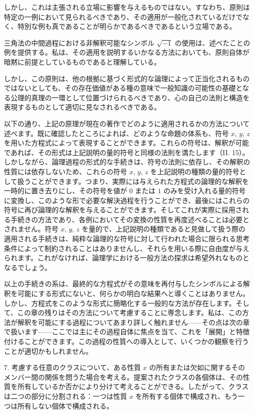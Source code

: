 \documentclass[a4paper,11pt,openany]{ltjsbook}
\begin{document}
しかし、これは主張される立場に影響を与えるものではない。すなわち、原則は特定の一例において見られるべきであり、その適用が一般化されているだけでなく、特別な例も真であることが明らかであるべきであるという立場である。

三角法の中間過程における非解釈可能なシンボル $\sqrt{-1}$ の使用は、述べたことの例を提供する。私は、その適用を説明するいかなる方法においても、原則自体が暗黙に前提としているものであると理解している。

しかし、この原則は、他の根拠に基づく形式的な論理によって正当化されるものではないとしても、その存在価値がある種の意味で一般知識の可能性の基礎となる公理的真理の一環として位置づけられるべきであり、心の自己の法則と構造を表現するものとして適切に見なされるべきである。

以下の通り、上記の原理が現在の著作でどのように適用されるかの方法について述べます。既に確認したところによれば、どのような命題の体系も、符号 $x$, $y$, $z$ を用いた方程式によって表現することができます。これらの符号は、解釈が可能であれば、その形式は上記説明の量的符号と同様の法則を満たします（II. 15）。しかしながら、論理過程の形式的な手続きは、符号の法則に依存し、その解釈の性質には依存しないため、これらの符号 $x$, $y$, $z$ を上記説明の種類の量的符号として扱うことができます。つまり、実際には与えられた方程式の論理的な解釈を一時的に置き去りにし、その符号を値が $0$ または $1$ のみを受け入れる量的符号に変換し、このような形で必要な解決過程を行うことができ、最後にはこれらの符号に再び論理的な解釈を与えることができます。そしてこれが実際に採用される手続きの方法であり、各例においてその変換の性質を再度述べることは必要とされません。符号 $x$, $y$, $z$ を量的で、上記説明の種類であると見做して扱う際の適用される手続きは、純粋な論理的な符号に対して行われた場合に限られる思考条件によって制約されることはありませんし、それらを用いる際に自由度が与えられます。これがなければ、論理学における一般方法の探求は希望外れなものとなるでしょう。

以上の手続きの系は、最終的な方程式がその意味を再付与したシンボルによる解釈を可能にする形式にないと、何らかの明白な結果へと導くことはありません。しかし、方程式をこのような形式に簡略化する一般的な方法が存在します。そして、この章の残りはその方法について考慮することに専念します。私は、この方法が解釈を可能にする過程についてあまり詳しく触れません——その点は次の章で扱います——ここでは主にその過程自体に焦点を当て、これを「展開」と特徴付けることができます。この過程の性質への導入として、いくつかの観察を行うことが適切かもしれません。

7. 考慮する任意のクラスについて、ある性質 \( x \) の所有または欠如に関するそのメンバー間の関係を問うた場合を考える。提案されたクラスの各個体は、その性質を所有しているか否かにより分けて考えることができる。したがって、クラスは二つの部分に分割される：一つは性質 \( x \) を所有する個体で構成され、もう一つは所有しない個体で構成される。
\end{document}

